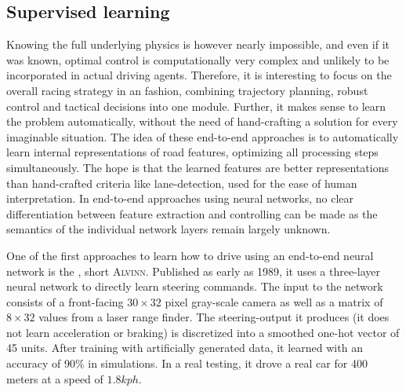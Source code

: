 \subsection{Supervised learning}

Knowing the full underlying physics is however nearly impossible, and even if it was known, optimal control is computationally very complex and unlikely to be incorporated in actual driving agents. Therefore, it is interesting to focus on the overall racing strategy in an  fashion, combining trajectory planning, robust control and tactical decisions into one module. Further, it makes sense to learn the problem automatically, without the need of hand-crafting a solution for every imaginable situation. The idea of these end-to-end approaches is to automatically learn internal representations of road features, optimizing all processing steps simultaneously. The hope is that the learned features are better representations than hand-crafted criteria like lane-detection, used for the ease of human interpretation. In end-to-end approaches using neural networks, no clear differentiation between feature extraction and controlling can be made as the semantics of the individual network layers remain largely unknown.

One of the first approaches to learn how to drive using an end-to-end neural network is the , short \textsc{Alvinn}\cite{pomerleau_alvinn:_1989}. Published as early as 1989, it uses a three-layer neural network to directly learn steering commands. The input to the network consists of a front-facing $30\times32$ pixel gray-scale camera as well as a matrix of $8\times32$ values from a laser range finder. The steering-output it produces (it does not learn acceleration or braking) is discretized into a smoothed one-hot vector of 45 units. After training with artificially generated data, it learned with an accuracy of 90\% in simulations. In a real testing, it drove a real car for 400 meters at a speed of $1.8 kph$. 

